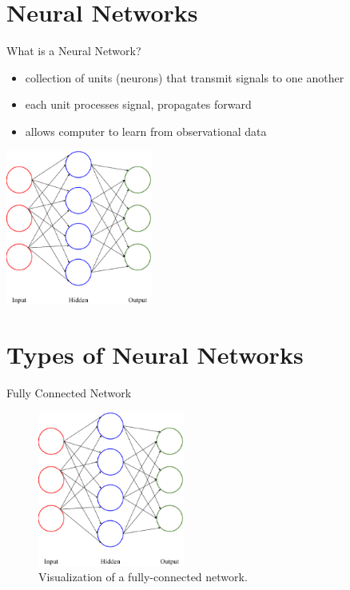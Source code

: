 \documentclass{beamer}
\begin{document}
  \section{Neural Networks}
  \begin{frame}{What is a Neural Network?}
    \begin{itemize}
      \item collection of units (neurons) that transmit signals to one another
      \item each unit processes signal, propagates forward
      \item allows computer to learn from observational data
    \end{itemize}
    \begin{center}
      \includegraphics[height=2in]{../figures/neural_network.eps}
    \end{center}
  \end{frame}

  \section{Types of Neural Networks}
  \begin{frame}{Fully Connected Network}
    \begin{figure}[ht!]
      \centering
      \includegraphics[height=2in]{../figures/neural_network.eps}
      \caption{Visualization of a fully-connected network.}
      \label{fig:nn}
    \end{figure} 
  \end{frame}
\end{document}
